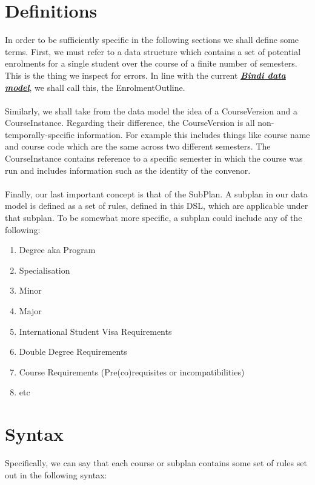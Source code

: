 \documentclass[twoside,twocolumn]{article}
\begin{document}
\section{Definitions}

In order to be sufficiently specific in the following sections we shall define some terms. First, we must refer to a data structure which contains a set of potential enrolments for a single student over the course of a finite number of semesters. This is the thing we inspect for errors. In line with the current \href{https://drive.google.com/open?id=0B6Gi8SxOYcVcQ3JFRE9yY3dTVmM}{\textbf{\textit{Bindi data model}}}, we shall call this, the EnrolmentOutline.
\paragraph*{}
Similarly, we shall take from the data model the idea of a CourseVersion and a CourseInstance. Regarding their difference, the CourseVersion is all non-temporally-specific information. For example this includes things like course name and course code which are the same across two different semesters. The CourseInstance contains reference to a specific semester in which the course was run and includes information such as the identity of the convenor.
\paragraph*{}
Finally, our last important concept is that of the SubPlan. A subplan in our data model is defined as a set of rules, defined in this DSL, which are applicable under that subplan. To be somewhat more specific, a subplan could include any of the following:
\begin{enumerate}
\item Degree aka Program
\item Specialisation
\item Minor
\item Major
\item International Student Visa Requirements
\item Double Degree Requirements
\item Course Requirements (Pre(co)requisites or incompatibilities)
\item etc
\end{enumerate}
\section{Syntax}
Specifically, we can say that each course or subplan contains some set of rules set out in the following syntax:
\end{document}
